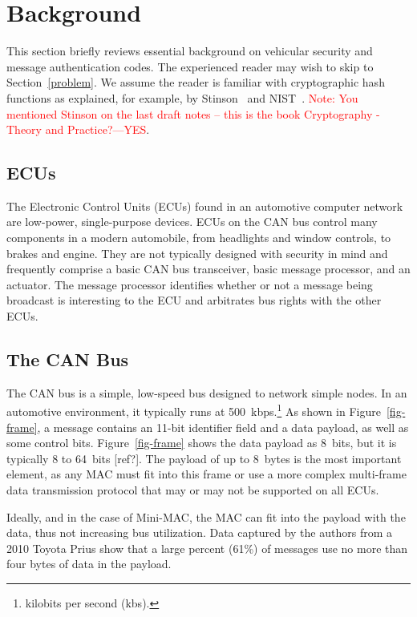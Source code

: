 \section{Background}
\label{background}

This section briefly reviews essential background on vehicular security and message authentication codes. 
The experienced reader may wish to skip to Section~\ref{problem}. 
We assume the reader is familiar with cryptographic hash functions as explained, for example, by Stinson~\cite{Sti} and NIST~\cite{FIPS-180-4}.
\textcolor{red}{Note: You mentioned Stinson on the last draft notes -- this is the book Cryptography - Theory and Practice?---YES}.

\subsection{ECUs}
The Electronic Control Units (ECUs) found in an automotive computer network are low-power, single-purpose devices. ECUs on the CAN bus control many components in a modern automobile, from headlights and window controls, to brakes and engine. They are not typically designed with security in mind and frequently comprise a basic CAN bus transceiver, basic message processor, and an actuator. The message processor identifies whether or not a message being broadcast is interesting to the ECU and arbitrates bus rights with the other ECUs. 

\subsection{The CAN Bus}
The CAN bus is a simple, low-speed bus designed to network simple nodes. In an automotive environment, 
it typically runs at 500~kbps.\footnote{kilobits per second (kbs).} As shown in Figure~\ref{fig-frame}, 
a message contains an 11-bit identifier field and 
a data payload, as well as some control bits. Figure~\ref{fig-frame} shows the data payload as 8~bits, but
it is typically 8 to 64~bits [ref?].
The payload of up to 8~bytes is the most important element, as any MAC must fit into this frame or use a more complex multi-frame data transmission protocol that may or may not be supported on all ECUs. 

Ideally, and in the case of Mini-MAC, the MAC can fit into the payload with the data, thus not increasing bus utilization. Data captured by the authors from a 2010 Toyota Prius show that a large percent (61\%) of messages use no more than four bytes of data in the payload.

